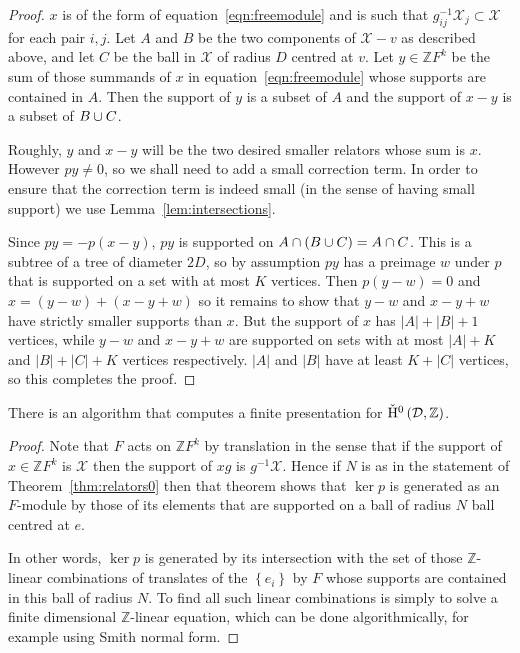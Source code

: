 \begin{proof}
$x$ is of the form of equation~\ref{eqn:freemodule} and is such that
$g_{ij}^{-1}\mathcal{X}_j \subset \mathcal{X}$ for each pair $i, j$. Let
$A$ and $B$ be the two components of $\mathcal{X} - v$ as described
above, and let $C$ be the ball in $\mathcal{X}$ of radius $D$ centred at
$v$. Let $y \in \mathbb{Z}F^k$ be the sum of those summands of $x$ in
equation~\ref{eqn:freemodule} whose supports are contained in $A$.  Then the
support of $y$ is a subset of $A$ and the support of $x-y$ is a subset of
$B \cup C$. 

Roughly, $y$ and $x-y$ will be the two desired smaller relators whose sum
is $x$. However $py \neq 0$, so we shall need to add a small correction
term.  In order to ensure that the correction term is indeed small (in the
sense of having small support) we use Lemma~\ref{lem:intersections}. 

Since $py = -p\left(x-y\right)$, $py$ is supported on $A \cap
\left(B \cup C\right) = A \cap C$. This is a subtree of a tree of
diameter $2D$, so by assumption $py$ has a preimage $w$ under $p$ that
is supported on a set with at most $K$ vertices. Then $p\left(y-w\right) =
0$ and $x = \left(y-w\right) + \left(x-y+w\right)$ so it remains to show
that $y-w$ and $x-y+w$ have strictly smaller supports than $x$. But the
support of $x$ has $\left|A\right| + \left|B\right| + 1$ vertices, while
$y-w$ and $x-y+w$ are supported on sets with at most $\left|A\right| + K$
and $\left| B \right| + \left|C\right| + K$ vertices respectively.  $\left|
A \right|$ and $\left|B\right|$ have at least $K + \left|C\right|$
vertices, so this completes the proof.\end{proof}

\begin{cor} There is an algorithm that computes a finite presentation for
$\check{\mathrm{H}}{}^0\left(\mathcal{D}, \mathbb{Z}\right)$.\end{cor}

\begin{proof} Note that $F$ acts on $\mathbb{Z}F^k$ by translation in the
sense that if the support of $x \in \mathbb{Z}F^k$ is $\mathcal{X}$ then
the support of $xg$ is $g^{-1}\mathcal{X}$. Hence if $N$ is as in the
statement of Theorem~\ref{thm:relators0} then that theorem shows that $\ker
p$ is generated as an $F$-module by those of its elements that are supported
on a ball of radius $N$ ball centred at $e$. 

In other words, $\ker p$ is generated by its intersection with the set of
those $\mathbb{Z}$-linear combinations of translates of the $\left\{
e_i\right\}$ by $F$ whose supports are contained in this ball of radius
$N$.  To find all such linear combinations is simply to solve a finite
dimensional $\mathbb{Z}$-linear equation, which can be done algorithmically,
for example using Smith normal form.\end{proof}

